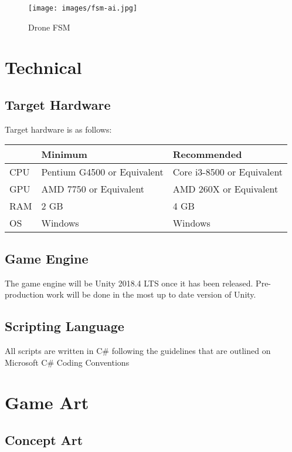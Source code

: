 \documentclass[11pt]{report}
\begin{document}
\begin{figure}[h!]
	\texttt{[image: images/fsm-ai.jpg]}
	\caption{Drone FSM}
\end{figure}

\chapter{Technical}

\section{Target Hardware}

Target hardware is as follows:

\begin{tabular}{|l|l|l|}
    \hline
     & Minimum & Recommended \\ \hline
     CPU & Pentium G4500 or Equivalent & Core i3-8500 or Equivalent \\ \hline
     GPU & AMD 7750 or Equivalent & AMD 260X or Equivalent \\ \hline
     RAM & 2 GB & 4 GB \\ \hline
     OS & Windows & Windows \\
    \hline
\end{tabular}

\section{Game Engine}

The game engine will be Unity 2018.4 LTS once it has been released. Pre-production work will be done in the most up to date version of Unity.

\section{Scripting Language}

All scripts are written in C\# following the guidelines that are outlined on Microsoft C\# Coding Conventions

\chapter{Game Art}

\section{Concept Art}
\end{document}
